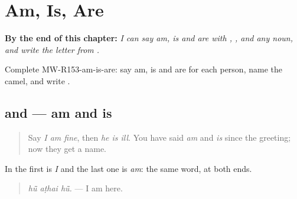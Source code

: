 
\chapter{Am, Is, Are}
\label{ch:mw-a2-am-is-are}

\begin{chapteropening}
\textbf{By the end of this chapter:} \emph{I can say am, is and are with , ,  and any noun, and write the letter  from .}

Complete MW-R153-am-is-are: say am, is and are for each person, name the camel, and write .
\end{chapteropening}

\section[\texorpdfstring{\mw{हूं} · \mw{है} (hū̃ · hai)}{हूं · है (hū̃ · hai)}]{ and  — am and is}

\label{lesson:MW-C153-hu-hai}



\begin{quote}
Say \emph{I am fine}, then \emph{he is ill}. You have said \emph{am} and \emph{is} since the greeting; now they get a name.
\end{quote}

\begin{grammarlens}[title={Grammar Lens: \mw{हूं} … \mw{हूं}}]
In \textbf{  } the first \textbf{} is \emph{I} and the last one is \emph{am}: the same word, at both ends.

\begin{quote}
\textbf{  }
\end{quote}

\begin{quote}
\emph{hū̃ aṭhai hū̃.} — I am here.
\end{quote}
\end{grammarlens}

